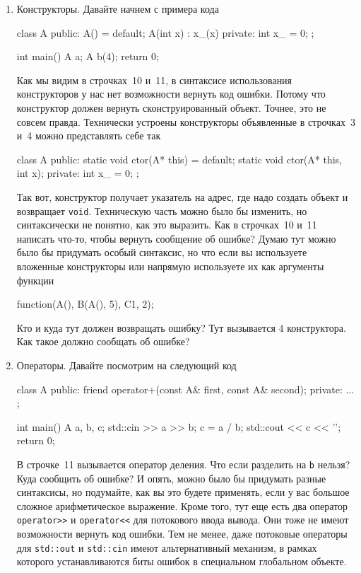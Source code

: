 \begin{enumerate}
\item Конструкторы.
Давайте начнем с примера кода
\begin{cppcode}
class A {
public:
  A() = default;
  A(int x) : x_(x) {}
private:
  int x_ = 0;
};

int main() {
  A a;
  A b(4);
  return 0;
}
\end{cppcode}
Как мы видим в строчках~10 и~11, в синтаксисе использования конструкторов у нас нет возможности вернуть код ошибки.
Потому что конструктор должен вернуть сконструированный объект.
Точнее, это не совсем правда.
Технически устроены конструкторы объявленные в строчках~3 и~4 можно представлять себе так
\begin{cppcode}
class A {
public:
  static void ctor(A* this) = default;
  static void ctor(A* this, int x);
private:
  int x_ = 0;
};
\end{cppcode}
Так вот, конструктор получает указатель на адрес, где надо создать объект и возвращает \verb"void".
Техническую часть можно было бы изменить, но синтаксически не понятно, как это выразить.
Как в строчках~10 и~11 написать что-то, чтобы вернуть сообщение об ошибке?
Думаю тут можно было бы придумать особый синтаксис, но что если вы используете вложенные конструкторы или напрямую используете их как аргументы функции
\begin{cppcode}
function(A(), B(A(), 5), C{1, 2});
\end{cppcode}
Кто и куда тут должен возвращать ошибку?
Тут вызывается $4$ конструктора.
Как такое должно сообщать об ошибке?

\item Операторы.
Давайте посмотрим на следующий код
\begin{cppcode}
class A {
public:
  friend operator+(const A& first, const A& second);
private:
  ...
};

int main() {
  A a, b, c;
  std::cin >> a >> b;
  c = a / b;
  std::cout << c << '\n';
  return 0;
}
\end{cppcode}
В строчке~11 вызывается оператор деления.
Что если разделить на \verb"b" нельзя?
Куда сообщить об ошибке?
И опять, можно было бы придумать разные синтаксисы, но подумайте, как вы это будете применять, если у вас большое сложное арифметическое выражение.
Кроме того, тут еще есть два оператор \verb"operator>>" и \verb"operator<<" для потокового ввода вывода.
Они тоже не имеют возможности вернуть код ошибки.
Тем не менее, даже потоковые операторы для \verb"std::out" и \verb"std::cin" имеют альтернативный механизм, в рамках которого устанавливаются биты ошибок в специальном глобальном объекте.
\end{enumerate}

